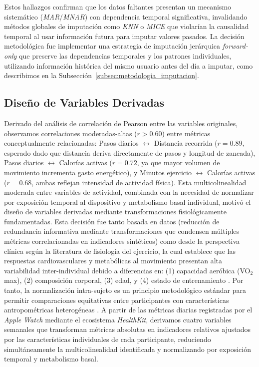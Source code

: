 Estos hallazgos confirman que los datos faltantes presentan un mecanismo sistemático (\textit{MAR}/\textit{MNAR}) con dependencia temporal significativa, invalidando métodos globales de imputación como \textit{KNN} o \textit{MICE} que violarían la causalidad temporal al usar información futura para imputar valores pasados. La decisión metodológica fue implementar una estrategia de imputación jerárquica \textit{forward-only} que preserve las dependencias temporales y los patrones individuales, utilizando información histórica del mismo usuario antes del día a imputar, como describimos en la Subsección~\ref{subsec:metodologia_imputacion}.

\subsection{Diseño de Variables Derivadas}
\label{subsec:variables_derivadas}

Derivado del análisis de correlación de Pearson entre las variables originales, observamos correlaciones moderadas-altas ($r>0.60$) entre métricas conceptualmente relacionadas: Pasos diarios $\leftrightarrow$ Distancia recorrida ($r=0.89$, esperado dado que distancia deriva directamente de pasos y longitud de zancada), Pasos diarios $\leftrightarrow$ Calorías activas ($r=0.72$, ya que mayor volumen de movimiento incrementa gasto energético), y Minutos ejercicio $\leftrightarrow$ Calorías activas ($r=0.68$, ambas reflejan intensidad de actividad física). Esta multicolinealidad moderada entre variables de actividad, combinada con la necesidad de normalizar por exposición temporal al dispositivo y metabolismo basal individual, motivó el diseño de variables derivadas mediante transformaciones fisiológicamente fundamentadas. Esta decisión fue tanto basada en datos (reducción de redundancia informativa mediante transformaciones que condensen múltiples métricas correlacionadas en indicadores sintéticos) como desde la perspectiva clínica según la literatura de fisiología del ejercicio, la cual establece que las respuestas cardiovasculares y metabólicas al movimiento presentan alta variabilidad inter-individual debido a diferencias en: (1) capacidad aeróbica (VO$_2$max), (2) composición corporal, (3) edad, y (4) estado de entrenamiento \cite{Riebe2018ACSM}. Por tanto, la normalización intra-sujeto es un principio metodológico estándar para permitir comparaciones equitativas entre participantes con características antropométricas heterogéneas \cite{Schrack2018,Ho2022}. A partir de las métricas diarias registradas por el \textit{Apple Watch} mediante el ecosistema \textit{HealthKit}, derivamos cuatro variables semanales que transforman métricas absolutas en indicadores relativos ajustados por las características individuales de cada participante, reduciendo simultáneamente la multicolinealidad identificada y normalizando por exposición temporal y metabolismo basal.


